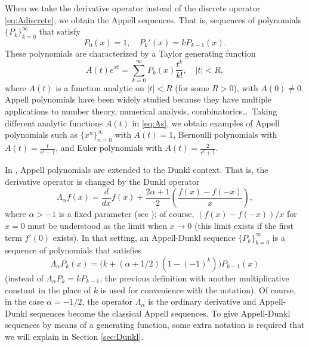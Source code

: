 \documentclass[11pt,a4paper]{article}
\theoremstyle{plain}
\theoremstyle{remark}
\newcommand{\La}{\Lambda_{\alpha}}
\begin{document}
When we take the derivative operator instead of the discrete operator \eqref{eq:Adiscrete}, we obtain the Appell sequences. That is, sequences of polynomials $\{P_k\}_{k=0}^{\infty}$ that satisfy
\begin{equation*}
  P_0(x)=1,\quad P_k'(x)=kP_{k-1}(x).
\end{equation*}
These polynomials are characterized by a Taylor generating function
\begin{equation}
\label{eq:As}
  A(t) e^{xt} = \sum_{k=0}^{\infty} P_k(x) \frac{t^k}{k!},
  \quad |t| < R,
\end{equation}
where $A(t)$ is a function analytic on $|t|<R$ (for some $R>0$), with $A(0) \ne 0$. Appell polynomials have been widely studied because they have multiple applications to number theory, numerical analysis, combinatorics\dots\ Taking different analytic functions $A(t)$ in \eqref{eq:As}, we obtain examples of Appell polynomials such as $\{x^n\}_{n=0}^{\infty}$ with $A(t)=1$, Bernoulli polynomials with $A(t)=\frac{t}{e^t-1}$, and Euler polynomials with $A(t)=\frac{2}{e^t+1}$.

In \cite{CDPV, CMV, DH}, Appell polynomials are extended to the Dunkl context. That is, the derivative operator is changed by the Dunkl operator 
\begin{equation}
\label{eq:La}
  \La f(x) = \frac{d}{dx}f(x) + \frac{2\alpha+1}{2}
  \left(\frac{f(x)-f(-x)}{x}\right),
\end{equation}
where $\alpha > -1$ is a fixed parameter (see \cite{Du, Ros}); of course, $(f(x)-f(-x))/x$ for $x=0$ must be understood as the limit when $x\to0$ (this limit exists if the first term $f'(0)$ exists). In that setting, an Appell-Dunkl sequence $\{P_k\}_{k=0}^{\infty}$ is
a sequence of polynomials that satisfies
\begin{equation*}
  \La P_k(x) = \big(k+(\alpha+1/2)(1-(-1)^k)\big)P_{k-1}(x)
\end{equation*}
(instead of $\La P_k = k P_{k-1}$, the previous definition with 
another multiplicative constant in the place of $k$ is used for 
convenience with the notation). Of course, in the case $\alpha=-1/2$,
the operator $\La$ is the ordinary derivative and Appell-Dunkl sequences become
the classical Appell sequences. To give Appell-Dunkl sequences by means of 
a generating function, some extra notation is required that we will explain in Section \ref{sec:Dunkl}.
\end{document}
